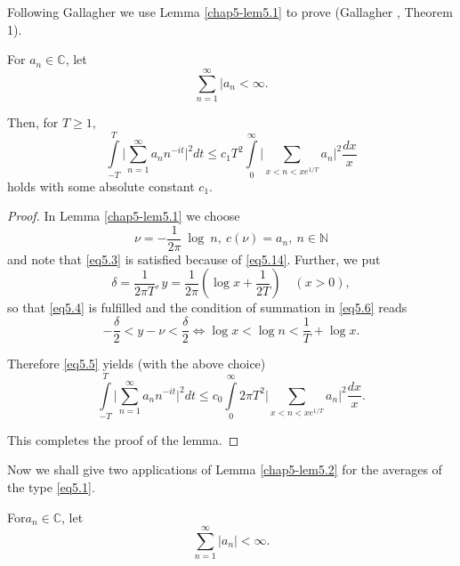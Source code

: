 Following Gallagher we use Lemma \ref{chap5-lem5.1} to prove
(Gallagher \cite{key4}, Theorem 1). 

\begin{lemma}\label{chap5-lem5.2}
For $a_n \in \mathbb{C}$, let
\begin{equation*}
\sum_{n=1}^{\infty}|a_n < \infty.\tag{5.14}\label{eq5.14}
\end{equation*}
\end{lemma}

Then, for $T \geq 1$,
\begin{equation*}
\int\limits_{-T}^T \Big| \sum_{n=1}^{\infty} a_n n^{-it}\Big|^2 dt
\leq c_1 T^2 \int\limits_0^\infty \Big| \sum_{x<n<xe^{1/T}} a_n\Big|^2
\frac{dx}{x} \tag{5.15}\label{eq5.15} 
\end{equation*}
holds with some absolute constant $c_1$.

\begin{proof}
In Lemma \ref{chap5-lem5.1} we choose
\begin{equation*}
\nu = - \frac{1}{2\pi}~\log ~ n, ~ c(\nu ) = a_n, ~ n\in \mathbb{N}
\tag{5.16}\label{eq5.16} 
\end{equation*}
and note that \eqref{eq5.3} is satisfied because of
\eqref{eq5.14}. Further, we put 
\begin{equation*}
\delta = \frac{1}{2\pi T}, y = \frac{1}{2\pi}(\log x + \frac{1}{2T})
\quad (x > 0), \tag{5.17}\label{eq5.17} 
\end{equation*}
so that \eqref{eq5.4} is fulfilled and the condition of summation in
\eqref{eq5.6} reads 
\begin{equation*}
- \frac{\delta}{2} < y - \nu < \frac{\delta}{2} \Leftrightarrow \log x
< \log n < \frac{1}{T} + \log x. \tag{5.18}\label{eq5.18} 
\end{equation*}

Therefore \eqref{eq5.5} yields (with the above choice)
\begin{equation*}
\int\limits_{-T}^{T} \Big| \sum_{n=1}^{\infty} a_n n^{-it} \Big|^2 dt
\leq c_0 \int\limits_{0}^{\infty} 2\pi T^2 \Big| \sum_{x<n<xe^{1/T}}
a_n \Big|^2 \frac{dx}{x}. \tag{5.19}\label{eq5.19} 
\end{equation*}

This completes the proof of the lemma.
\end{proof}

Now we shall give two applications of Lemma \ref{chap5-lem5.2} for the
averages of the type \eqref{eq5.1}. 

\setcounter{theorem}{0}
\begin{theorem}\label{chap5-thm5.1}
For\pageoriginale $a_n \in \mathbb{C}$, let
\begin{equation*}
\sum_{n=1}^{\infty}|a_n| < \infty . \tag{5.20}\label{eq5.20}
\end{equation*}
\end{theorem}

